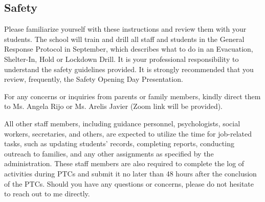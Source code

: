 \documentclass[11pt, letterpaper]{article}
\begin{document}
\subsection{Safety}
    Please familiarize yourself with these instructions and review them with your students. The school will train and drill all staff and students in the General Response Protocol in September, which describes what to do in an Evacuation, Shelter-In, Hold or Lockdown Drill. It is your professional responsibility to understand the safety guidelines provided. It is strongly recommended that you review, frequently, the  Safety Opening Day Presentation.

For any concerns or inquiries from parents or family members, kindly direct them to Ms. Angela Rijo or Ms. Arelis Javier (Zoom link will be provided).

All other staff members, including guidance personnel, psychologists, social workers, secretaries, and others, are expected to utilize the time for job-related tasks, such as updating students' records, completing reports, conducting outreach to families, and any other assignments as specified by the administration. These staff members are also required to complete the log of activities during PTCs and submit it no later than 48 hours after the conclusion of the PTCs.
Should you have any questions or concerns, please do not hesitate to reach out to me directly.





\newpage
\thispagestyle{empty}

\end{document}
